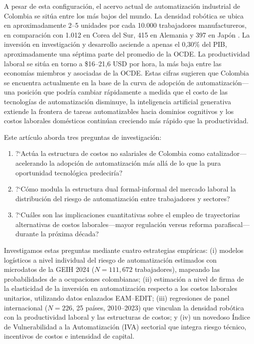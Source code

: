\documentclass{article}
\begin{document}
A pesar de esta configuraci\'on, el acervo actual de automatizaci\'on industrial de Colombia se sit\'ua entre los m\'as bajos del mundo. La densidad rob\'otica se ubica en aproximadamente 2--5 unidades por cada 10.000 trabajadores manufactureros, en comparaci\'on con 1.012 en Corea del Sur, 415 en Alemania y 397 en Jap\'on \cite{ifr2024}. La inversi\'on en investigaci\'on y desarrollo asciende a apenas el 0,30\% del PIB, aproximadamente una s\'eptima parte del promedio de la OCDE. La productividad laboral se sit\'ua en torno a \$16--21,6 USD por hora, la m\'as baja entre las econom\'ias miembros y asociadas de la OCDE. Estas cifras sugieren que Colombia se encuentra actualmente en la base de la curva de adopci\'on de automatizaci\'on---una posici\'on que podr\'ia cambiar r\'apidamente a medida que el costo de las tecnolog\'ias de automatizaci\'on disminuye, la inteligencia artificial generativa extiende la frontera de tareas automatizables hacia dominios cognitivos y los costos laborales dom\'esticos contin\'uan creciendo m\'as r\'apido que la productividad.

Este art\'iculo aborda tres preguntas de investigaci\'on:
\begin{enumerate}[label=(\arabic*)]
\item ?`Act\'ua la estructura de costos no salariales de Colombia como catalizador---acelerando la adopci\'on de automatizaci\'on m\'as all\'a de lo que la pura oportunidad tecnol\'ogica predecir\'ia?
\item ?`C\'omo modula la estructura dual formal-informal del mercado laboral la distribuci\'on del riesgo de automatizaci\'on entre trabajadores y sectores?
\item ?`Cu\'ales son las implicaciones cuantitativas sobre el empleo de trayectorias alternativas de costos laborales---mayor regulaci\'on versus reforma parafiscal---durante la pr\'oxima d\'ecada?
\end{enumerate}

Investigamos estas preguntas mediante cuatro estrategias emp\'iricas: (i) modelos log\'isticos a nivel individual del riesgo de automatizaci\'on estimados con microdatos de la GEIH 2024 ($N = 111{,}672$ trabajadores), mapeando las probabilidades de \cite{frey2017future} a ocupaciones colombianas; (ii) estimaci\'on a nivel de firma de la elasticidad de la inversi\'on en automatizaci\'on respecto a los costos laborales unitarios, utilizando datos enlazados EAM--EDIT; (iii) regresiones de panel internacional ($N = 226$, 25 pa\'ises, 2010--2023) que vinculan la densidad rob\'otica con la productividad laboral y las estructuras de costos; y (iv) un novedoso \'Indice de Vulnerabilidad a la Automatizaci\'on (IVA) sectorial que integra riesgo t\'ecnico, incentivos de costos e intensidad de capital.
\end{document}
